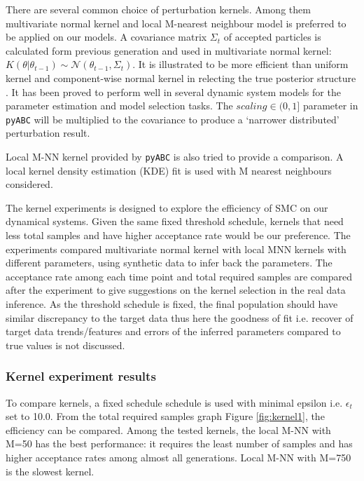 There are several common choice of perturbation kernels. Among them multivariate normal kernel and local M-nearest neighbour model is preferred to be applied on our models. A covariance matrix $\Sigma_t$ of accepted particles is calculated form previous generation and used in multivariate normal kernel: $K(\theta|\theta_{t-1})\sim\mathcal{N}(\theta_{t-1}, \Sigma_t)$. It is illustrated to be more efficient than uniform kernel and component-wise normal kernel in relecting the true posterior structure \cite{ref:kernel}. It has been proved to perform well in several dynamic system models \cite{ref:abcsysbio, ref:compare, ref:disease} for the parameter estimation and model selection tasks. The $scaling\in(0,1]$ parameter in \verb|pyABC| will be multiplied to the covariance to produce a `narrower distributed' perturbation result.

Local M-NN kernel provided by \verb|pyABC| is also tried to provide a comparison. A local kernel density estimation (KDE) fit is used with M nearest neighbours considered.

The kernel experiments is designed to explore the efficiency of SMC on our dynamical systems. Given the same fixed threshold schedule, kernels that need less total samples and have higher acceptance rate would be our preference. The experiments compared multivariate normal kernel with local MNN kernels with different parameters, using synthetic data to infer back the parameters. The acceptance rate among each time point and total required samples are compared after the experiment to give suggestions on the kernel selection in the real data inference. As the threshold schedule is fixed, the final population should have similar discrepancy to the target data thus here the goodness of fit i.e. recover of target data trends/features and errors of the inferred parameters compared to true values is not discussed.

\subsubsection{Kernel experiment results}

To compare kernels, a fixed schedule schedule is used with minimal epsilon i.e. $\epsilon_t$ set to 10.0. From the total required samples graph Figure \ref{fig:kernel1}, the efficiency can be compared. Among the tested kernels, the local M-NN with M=50 has the best performance: it requires the least number of samples and
has higher acceptance rates among almost all generations. Local M-NN with M=750 is the slowest kernel.

